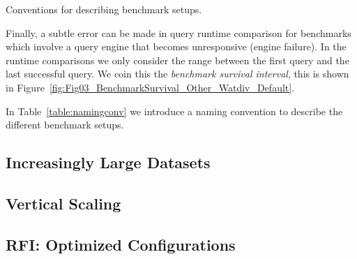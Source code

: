 \begin{table}[ht!]
	\centering
	\caption{Conventions for describing benchmark setups.}
	\label{table:namingconv}
	 \caption*{A description consists of a 3-character prefix describing the RDF storage solution, the number of nodes, the amount of memory and the configuration.}
\end{table}

Finally, a subtle error can be made in query runtime comparison for benchmarks which involve a query engine that becomes unresponsive (engine failure). In the runtime comparisons we only consider the range between the first query and the last successful query. We coin this the \emph{benchmark survival interval}, this is shown in Figure~\ref{fig:Fig03_BenchmarkSurvival_Other_Watdiv_Default}.

In Table~\ref{table:namingconv} we introduce a naming convention to describe the different benchmark setups. 

\subsection{Increasingly Large Datasets}
\label{subsec:bigdata}


\subsection{Vertical Scaling}
\label{subsec:vscaling}


\subsection{RFI: Optimized Configurations}
\label{subsec:rfi}


